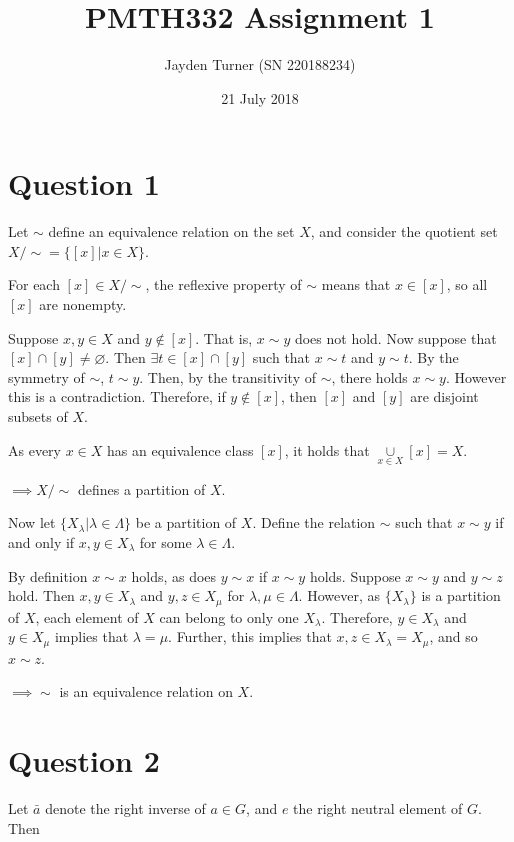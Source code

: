 \documentclass{article}
\title{PMTH332 Assignment 1}
\date{21 July 2018}
\author{Jayden Turner (SN 220188234)}
\begin{document}
\maketitle
{}

\section*{Question 1}

Let $\sim$ define an equivalence relation on the set $X$, and consider the quotient set $X/\sim = \{[x] | x \in X\}$.

\hfill \break
For each $[x] \in X/\sim$, the reflexive property of $\sim$ means that $x \in [x]$, so all $[x]$ are nonempty.

\hfill \break
Suppose $x, y \in X$ and $y \notin [x]$. That is, $x \sim y$ does not hold. Now suppose that $[x] \cap [y] \neq \varnothing$. Then
$\exists t \in [x] \cap [y]$ such that $x \sim t$ and $y \sim t$. By the symmetry of $\sim$, $t \sim y$. Then, by the transitivity of $\sim$,
there holds $x \sim y$. However this is a contradiction. Therefore, if $y \notin [x]$, then $[x]$ and $[y]$ are disjoint subsets of $X$.

\hfill \break
As every $x \in X$ has an equivalence class $[x]$, it holds that $\underset{x \in X}{\cup} [x] = X$.

\hfill \break
$\implies X/\sim$ defines a partition of $X$.

\hfill \break
Now let $\{X_\lambda | \lambda \in \Lambda\}$ be a partition of $X$. Define the relation $\sim$ such that $x \sim y$ if and only if $x, y \in X_\lambda$
for some $\lambda \in \Lambda$.

\hfill \break
By definition $x \sim x$ holds, as does $y \sim x$ if $x \sim y$ holds. Suppose $x \sim y$ and $y \sim z$ hold. Then $x, y \in X_\lambda$ and $y, z \in X_\mu$ for
$\lambda, \mu \in \Lambda$. However, as $\{X_\lambda\}$ is a partition of $X$, each element of $X$ can belong to only one $X_\lambda$. Therefore,
$y \in X_\lambda$ and $y \in X_\mu$ implies that $\lambda = \mu$. Further, this implies that $x, z \in X_\lambda = X_\mu$, and so $x \sim z$.

\hfill \break
$\implies \sim$ is an equivalence relation on $X$.

\section*{Question 2}

Let $\bar{a}$ denote the right inverse of $a \in G$, and $e$ the right neutral element of $G$. Then
\end{document}
